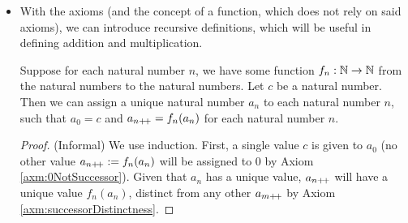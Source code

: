 \documentclass[../main.tex]{subfiles}
\begin{document}
\begin{itemize}
\begin{itemize}
        \item {}
    \end{itemize}
    \item With the axioms (and the concept of a function, which does not rely on said axioms), we can introduce recursive definitions, which will be useful in defining addition and multiplication.
    \begin{prp}
        Suppose for each natural number $n$, we have some function $f_n:\mathbb{N}\to\mathbb{N}$ from the natural numbers to the natural numbers. Let $c$ be a natural number. Then we can assign a unique natural number $a_n$ to each natural number $n$, such that $a_0=c$ and $a_{n{+\!+}}=f_n(a_n)$ for each natural number $n$.
        \begin{proof}
            (Informal) We use induction. First, a single value $c$ is given to $a_0$ (no other value $a_{n{+\!+}}:=f_n(a_n)$ will be assigned to 0 by Axiom \ref{axm:0NotSuccessor}). Given that $a_n$ has a unique value, $a_{n{+\!+}}$ will have a unique value $f_n(a_n)$, distinct from any other $a_{m{+\!+}}$ by Axiom \ref{axm:successorDistinctness}.
        \end{proof}
    \end{prp}
\end{itemize}
\end{document}
